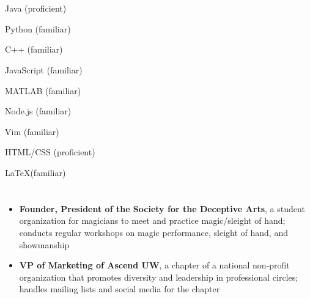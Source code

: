 \documentclass[10pt]{article}
\begin{document}
\begin{spacing}{0.3}
\section*{\color{crimson}{Skills}}
    \begin{itemize}
    \begin{multicols}{3}
        \item Java (proficient)
        \item Python (familiar)
        \item C++ (familiar)
        \item JavaScript (familiar)
        \item MATLAB (familiar)
        \item Node.js (familiar)
        \item Vim (familiar)
        \item HTML/CSS (proficient)
        \item \LaTeX (familiar)
        \end{multicols}
    \end{itemize}
\section*{\color{crimson}{Additional Experience/Leadership}}
\begin{itemize}
    \item \textbf{Founder, President of the Society for the Deceptive Arts}, a student organization for magicians to meet and practice magic/sleight of hand; conducts regular workshops on magic performance, sleight of hand, and showmanship
    \item \textbf{VP of Marketing of Ascend UW}, a chapter of a national non-profit organization that promotes diversity and leadership in professional circles; handles mailing lists and social media for the chapter
\end{itemize}
\end{spacing}
\end{document}
